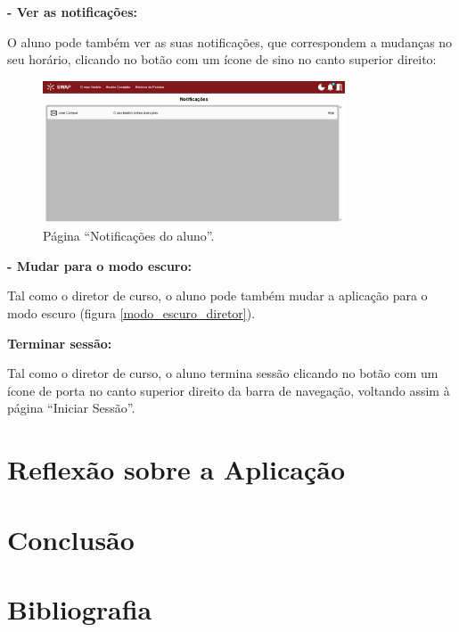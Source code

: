 \documentclass[12pt, a4paper]{article}
\begin{document}
\textbf{- Ver as notificações:}

O aluno pode também ver as suas notificações, que correspondem a mudanças no seu horário, clicando
no botão com um ícone de sino no canto superior direito:

\begin{figure}[H]
    \centering
    \includegraphics[width=0.8\textwidth]{res/manual/notificacoes_aluno.png}
    \caption{Página ``Notificações do aluno''.}
    \label{notificacoes_aluno}
\end{figure}

\textbf{- Mudar para o modo escuro:}

Tal como o diretor de curso, o aluno pode também mudar a aplicação para o modo escuro (figura
\ref{modo_escuro_diretor}).

\textbf{Terminar sessão:}

Tal como o diretor de curso, o aluno termina sessão clicando no botão com um ícone de porta no
canto superior direito da barra de navegação, voltando assim à página ``Iniciar Sessão''.

\section{Reflexão sobre a Aplicação}

\section{Conclusão}

\begingroup
\section{Bibliografia}
\renewcommand{\section}[2]{}
\end{document}
